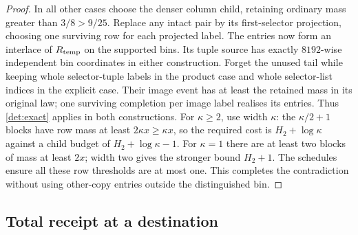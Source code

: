 \documentclass[11pt]{article} \usepackage[utf8]{inputenc}
\theoremstyle{plain} \newtheorem{theorem}{Theorem}[section]
\theoremstyle{definition} \newaliascnt{definition}{theorem}
\begin{document}
\begin{proof}
In all other cases choose the denser column child, retaining ordinary mass
greater than $3/8>9/25$. Replace any intact pair by its first-selector
projection, choosing one surviving row for each projected label. The entries
now form an interlace of $R_{\rm temp}$ on the supported bins. Its tuple
source has exactly $8192$-wise independent bin coordinates in either
construction. Forget the unused tail while keeping whole selector-tuple labels
in the product case and whole selector-list indices in the explicit case.
Their image event has at least the retained mass in its original law; one
surviving completion per image label realises its entries. Thus
\cref{det:exact} applies in both constructions. For $\kappa\ge2$,
use width $\kappa$: the $\kappa/2+1$ blocks have row mass at least
$2\kappa x\ge\kappa x$, so the required cost is $H_2+\log\kappa$ against a
child budget of $H_2+\log\kappa-1$. For $\kappa=1$ there are at least two
blocks of mass at least $2x$; width two gives the stronger bound $H_2+1$.
The schedules ensure all these row thresholds are at most one. This completes
the contradiction without using other-copy entries outside the distinguished
bin.
\end{proof}

\subsection{Total receipt at a destination}
\end{document}
